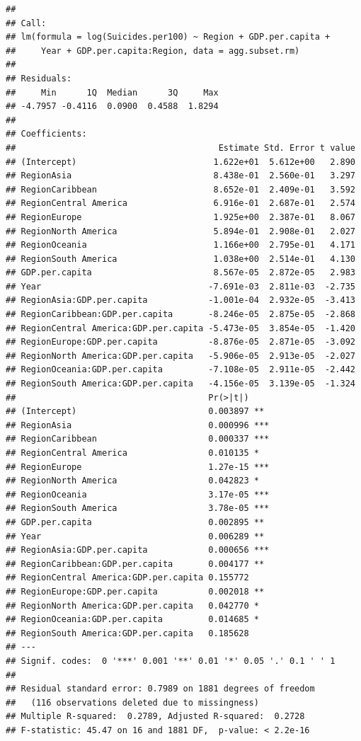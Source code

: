 \documentclass[11pt,]{article}
\begin{document}
\begin{verbatim}
## 
## Call:
## lm(formula = log(Suicides.per100) ~ Region + GDP.per.capita + 
##     Year + GDP.per.capita:Region, data = agg.subset.rm)
## 
## Residuals:
##     Min      1Q  Median      3Q     Max 
## -4.7957 -0.4116  0.0900  0.4588  1.8294 
## 
## Coefficients:
##                                        Estimate Std. Error t value
## (Intercept)                           1.622e+01  5.612e+00   2.890
## RegionAsia                            8.438e-01  2.560e-01   3.297
## RegionCaribbean                       8.652e-01  2.409e-01   3.592
## RegionCentral America                 6.916e-01  2.687e-01   2.574
## RegionEurope                          1.925e+00  2.387e-01   8.067
## RegionNorth America                   5.894e-01  2.908e-01   2.027
## RegionOceania                         1.166e+00  2.795e-01   4.171
## RegionSouth America                   1.038e+00  2.514e-01   4.130
## GDP.per.capita                        8.567e-05  2.872e-05   2.983
## Year                                 -7.691e-03  2.811e-03  -2.735
## RegionAsia:GDP.per.capita            -1.001e-04  2.932e-05  -3.413
## RegionCaribbean:GDP.per.capita       -8.246e-05  2.875e-05  -2.868
## RegionCentral America:GDP.per.capita -5.473e-05  3.854e-05  -1.420
## RegionEurope:GDP.per.capita          -8.876e-05  2.871e-05  -3.092
## RegionNorth America:GDP.per.capita   -5.906e-05  2.913e-05  -2.027
## RegionOceania:GDP.per.capita         -7.108e-05  2.911e-05  -2.442
## RegionSouth America:GDP.per.capita   -4.156e-05  3.139e-05  -1.324
##                                      Pr(>|t|)    
## (Intercept)                          0.003897 ** 
## RegionAsia                           0.000996 ***
## RegionCaribbean                      0.000337 ***
## RegionCentral America                0.010135 *  
## RegionEurope                         1.27e-15 ***
## RegionNorth America                  0.042823 *  
## RegionOceania                        3.17e-05 ***
## RegionSouth America                  3.78e-05 ***
## GDP.per.capita                       0.002895 ** 
## Year                                 0.006289 ** 
## RegionAsia:GDP.per.capita            0.000656 ***
## RegionCaribbean:GDP.per.capita       0.004177 ** 
## RegionCentral America:GDP.per.capita 0.155772    
## RegionEurope:GDP.per.capita          0.002018 ** 
## RegionNorth America:GDP.per.capita   0.042770 *  
## RegionOceania:GDP.per.capita         0.014685 *  
## RegionSouth America:GDP.per.capita   0.185628    
## ---
## Signif. codes:  0 '***' 0.001 '**' 0.01 '*' 0.05 '.' 0.1 ' ' 1
## 
## Residual standard error: 0.7989 on 1881 degrees of freedom
##   (116 observations deleted due to missingness)
## Multiple R-squared:  0.2789, Adjusted R-squared:  0.2728 
## F-statistic: 45.47 on 16 and 1881 DF,  p-value: < 2.2e-16
\end{verbatim}
\end{document}
